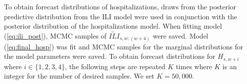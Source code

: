 







To obtain forecast distributions of hospitalizations, draws from the posterior 
predictive distribution from the ILI model were used in conjunction with the 
posterior distribution of the hospitalizations model. When fitting model 
(\ref{eq:ili_post}), MCMC samples of $\widetilde{ILI}_{s,w:(w + 4)}$ were 
saved. Model (\ref{eq:final_hosp}) was fit and MCMC samples for the marginal 
distributions for the model parameters were saved. To obtain forecast 
distributions for $H_{s,w + i}$ where $i \in \{1,2,3,4\}$, the following 
steps are repeated $K$ times where $K$ is an integer for the number of desired 
samples. We set $K = 50,000$.

